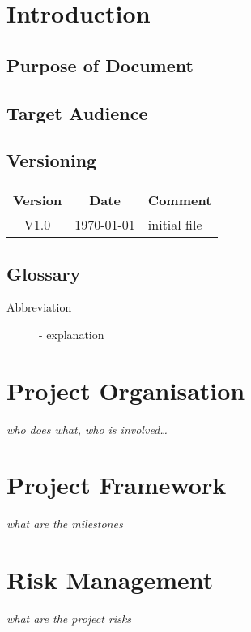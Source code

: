 \documentclass[a4paper, 10pt, fleqn]{article}
\begin{document}
	\begin{titlepage}
		\titleGM
		\thispagestyle{empty}
	\end{titlepage}
	
	\tableofcontents
	\listoffigures
	\listoftables
	
	\clearpage
	\section{Introduction}
		\subsection{Purpose of Document}
		\subsection{Target Audience}
		\subsection{Versioning}
			\begin{table}[h]
				\centering
				\begin{tabularx}{\textwidth}{|c|c|X|}
				\hline
				\rowcolor{shadecolor}\textbf{Version} & \textbf{Date} & \textbf{Comment}\\ \hline
				V1.0 & \today & initial file \\ \hline
				\end{tabularx}
			\end{table}
		\subsection{Glossary}
			\begin{description}
				\item[Abbreviation]- explanation
			\end{description}

	\section{Project Organisation}
		\textit{who does what, who is involved\ldots}
	\section{Project Framework}
		\textit{what are the milestones}
	\section{Risk Management}
		\textit{what are the project risks}
\end{document}
